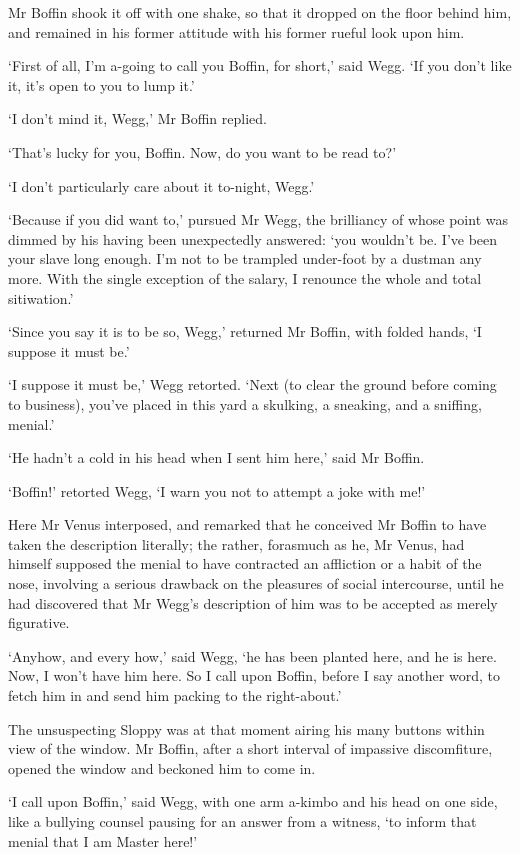 Mr Boffin shook it off with one shake, so that it dropped on the floor
behind him, and remained in his former attitude with his former rueful
look upon him.

‘First of all, I’m a-going to call you Boffin, for short,’ said Wegg.
‘If you don’t like it, it’s open to you to lump it.’

‘I don’t mind it, Wegg,’ Mr Boffin replied.

‘That’s lucky for you, Boffin. Now, do you want to be read to?’

‘I don’t particularly care about it to-night, Wegg.’

‘Because if you did want to,’ pursued Mr Wegg, the brilliancy of whose
point was dimmed by his having been unexpectedly answered: ‘you wouldn’t
be. I’ve been your slave long enough. I’m not to be trampled under-foot
by a dustman any more. With the single exception of the salary, I
renounce the whole and total sitiwation.’

‘Since you say it is to be so, Wegg,’ returned Mr Boffin, with folded
hands, ‘I suppose it must be.’

‘I suppose it must be,’ Wegg retorted. ‘Next (to clear the ground before
coming to business), you’ve placed in this yard a skulking, a sneaking,
and a sniffing, menial.’

‘He hadn’t a cold in his head when I sent him here,’ said Mr Boffin.

‘Boffin!’ retorted Wegg, ‘I warn you not to attempt a joke with me!’

Here Mr Venus interposed, and remarked that he conceived Mr Boffin to
have taken the description literally; the rather, forasmuch as he, Mr
Venus, had himself supposed the menial to have contracted an affliction
or a habit of the nose, involving a serious drawback on the pleasures of
social intercourse, until he had discovered that Mr Wegg’s description
of him was to be accepted as merely figurative.

‘Anyhow, and every how,’ said Wegg, ‘he has been planted here, and he
is here. Now, I won’t have him here. So I call upon Boffin, before I say
another word, to fetch him in and send him packing to the right-about.’

The unsuspecting Sloppy was at that moment airing his many buttons
within view of the window. Mr Boffin, after a short interval of
impassive discomfiture, opened the window and beckoned him to come in.

‘I call upon Boffin,’ said Wegg, with one arm a-kimbo and his head on
one side, like a bullying counsel pausing for an answer from a witness,
‘to inform that menial that I am Master here!’

